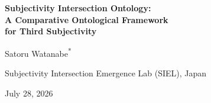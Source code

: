 \documentclass[11pt,a4paper]{article}
\begin{document}
\begin{center}
  \vspace*{12mm}
  {\LARGE\bfseries
   Subjectivity Intersection Ontology:\\[.32em]
   A Comparative Ontological Framework\\[.32em]
   for Third Subjectivity\par}
  \vspace{2.0em}
  {\large Satoru Watanabe\textsuperscript{*}\par}
  \vspace{.65em}
  {\large Subjectivity Intersection Emergence Lab (SIEL), Japan\par}
  \vspace{1.3em}
  {\large July 28, 2026\par}
\end{center}
\begingroup
\renewcommand{\thefootnote}{*}
\endgroup
\vspace{2.0em}










\clearpage
\appendix


\clearpage

\end{document}
